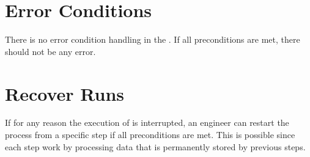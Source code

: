 \section{Error Conditions}

There is no error condition handling in the \FAQAS. If all preconditions are met, there should not be any error.

\section{Recover Runs}


If for any reason the execution of \SEMUS is interrupted, an engineer can restart the process from a specific step if all preconditions are met. This is possible since each \SEMUS step work by processing data that is permanently stored by previous steps.
